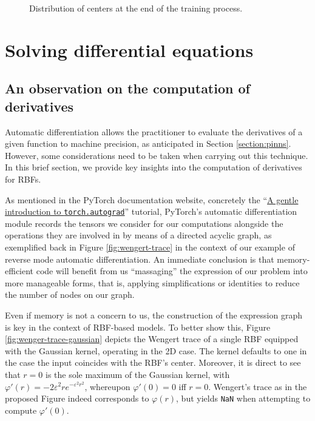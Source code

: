 \documentclass[12pt]{report} %
\begin{document}
\begin{figure}[h]
\begin{tabular}{cc}
  \end{tabular}
  \caption{Distribution of centers at the end of the training process.}
  \label{fig:parabola-results-centers}
\end{figure}


\clearpage
\section{Solving differential equations}\label{sec:preliminary-problem-2}

\subsection*{An observation on the computation of derivatives}

Automatic differentiation allows the
practitioner to evaluate the derivatives of a given function to machine precision, as anticipated in Section \ref{section:pinns}.
However, some considerations need to be taken when carrying out this technique. In this brief section, we provide key insights into the computation of derivatives for RBFs.

As mentioned in the PyTorch documentation website, concretely the
``\href{https://pytorch.org/tutorials/beginner/blitz/autograd_tutorial.html}{A gentle
  introduction to \texttt{torch.autograd}}'' tutorial, PyTorch's automatic differentiation
module records the tensors we consider for our computations alongside the operations
they are involved in by means of a directed acyclic graph, as exemplified back in
Figure \ref{fig:wengert-trace} in the context of our example of reverse
mode automatic differentiation. An immediate conclusion is that memory-efficient code will benefit from us
``massaging'' the expression of our problem into more manageable forms, that is, applying
simplifications or identities to reduce the number of nodes on our graph.


Even if memory is not a concern to us, the construction of the expression graph is key in the context of RBF-based models. To better show this, Figure \ref{fig:wenger-trace-gaussian}
depicts the Wengert trace of a single RBF equipped with the Gaussian kernel, operating in the 2D
case. The kernel defaults to one in the case the input coincides with the RBF's center. Moreover, it is direct to see that $r=0$ is the sole maximum of the Gaussian kernel, with $\varphi'(r)=-2 \varepsilon^2 r
  e^{-\varepsilon^2 r^2}$, whereupon $\varphi'(0)=0$ iff $r=0$. Wengert's trace as in the proposed Figure
indeed corresponds to $\varphi(r)$, but yields \texttt{NaN} when attempting to compute
$\varphi'(0)$.
\end{document}
